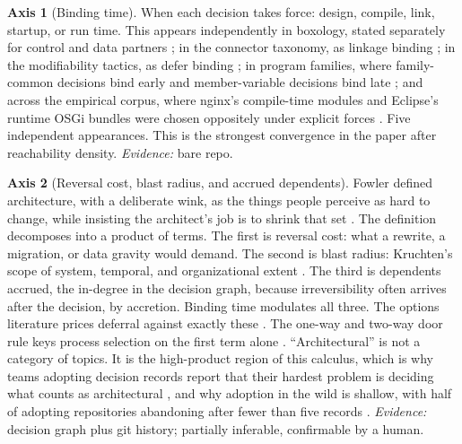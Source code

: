 \documentclass[11pt,oneside]{article}
\theoremstyle{definition}
\newtheorem{axis}{Axis}
\begin{document}
\begin{axis}[Binding time]\label{ax:binding}
When each decision takes force: design, compile, link, startup, or run time. This appears
independently in boxology, stated separately for control and data partners \cite{boxology1997};
in the connector taxonomy, as linkage binding \cite{mehta2000}; in the modifiability tactics, as
defer binding \cite{bass2012}; in program families, where family-common decisions bind early and
member-variable decisions bind late \cite{parnas1976}; and across the empirical corpus, where
nginx's compile-time modules and Eclipse's runtime OSGi bundles were chosen oppositely under
explicit forces \cite{aosanginx,aosaeclipse}. Five independent appearances. This is the
strongest convergence in the paper after reachability density. \emph{Evidence:} bare repo.
\end{axis}

\begin{axis}[Reversal cost, blast radius, and accrued dependents]\label{ax:reversal}
Fowler defined architecture, with a deliberate wink, as the things people perceive as hard to
change, while insisting the architect's job is to shrink that set \cite{fowler2003}. The
definition decomposes into a product of terms. The first is reversal cost: what a rewrite, a
migration, or data gravity would demand. The second is blast radius: Kruchten's scope of
system, temporal, and organizational extent \cite{kruchten2004}. The third is dependents
accrued, the in-degree in the decision graph, because irreversibility often arrives after the
decision, by accretion. Binding time modulates all three. The options literature
prices deferral against exactly these \cite{baldwinclark2000}. The one-way and two-way door
rule keys process selection on the first term alone \cite{bezos2015}. ``Architectural'' is not
a category of topics. It is the high-product region of this calculus, which is why teams
adopting decision records report that their hardest problem is deciding what counts as
architectural \cite{weiss2024}, and why adoption in the wild is shallow, with half of adopting
repositories abandoning after fewer than five records \cite{buchgeher2023}. \emph{Evidence:}
decision graph plus git history; partially inferable, confirmable by a human.
\end{axis}
\end{document}
